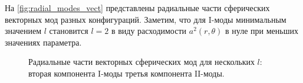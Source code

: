 \documentclass[12pt,a4paper]{article}
\begin{document}
        На \autoref{fig:radial_modes_vect} представлены радиальные части сферических векторных мод разных конфигураций. Заметим, что для $\mathrm{I}$-моды минимальным значением $l$ становится $l = 2$ в виду расходимости $a^2(r,\theta)$ в нуле при меньших значениях параметра.
        \begin{figure}[h]
            \centering
            \hspace{8pt}%
            \hspace{8pt}%
            \caption[]{Радиальные части векторных сферических мод для нескольких $l$: %
                 вторая компонента $\mathrm{I}$-моды %
                 третья компонента $\mathrm{II}$-моды. %
            } %
            \label{fig:radial_modes_vect}%
        \end{figure}


    \nocite{*}
    
    
\end{document}

